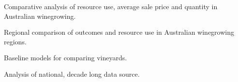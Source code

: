 \documentclass[review,12pt,authoryear]{elsarticle}
\begin{document}
\begin{linenumbers}
\begin{frontmatter}

\begin{highlights}
  \item Comparative analysis of resource use, average sale price and quantity in Australian winegrowing.
  \item Regional comparison of outcomes and resource use in Australian winegrowing regions.
  \item Baseline models for comparing vineyards.
  \item Analysis of national, decade long data source.
\end{highlights}
\end{frontmatter}

\end{linenumbers}
  
\end{document}
